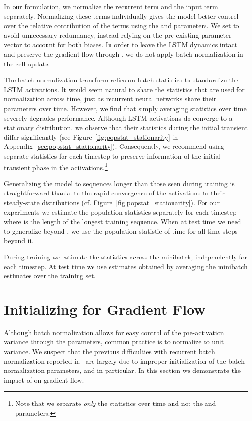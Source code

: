 \documentclass{article} \pdfoutput=1 \usepackage[utf8]{inputenc}
\begin{document}
In our formulation, we normalize the recurrent term 
and the input term  separately.  Normalizing these terms
individually gives the model better control over the relative contribution of
the terms using the  and  parameters.  We set  to avoid unnecessary redundancy, instead relying on the
pre-existing parameter vector  to account for both biases.  In order
to leave the LSTM dynamics intact and preserve the gradient flow through
, we do not apply batch normalization in the cell update.

The batch normalization transform relies on batch statistics to standardize the
LSTM activations.  It would seem natural to share the statistics that are used
for normalization across time, just as recurrent neural networks share their
parameters over time.  However, we find that simply averaging statistics over
time severely degrades performance.  Although LSTM activations do converge to a
stationary distribution, we observe that their statistics during the initial
transient differ significantly (see Figure~\ref{fig:popstat_stationarity} in Appendix~\ref{sec:popstat_stationarity}).
Consequently, we recommend using separate statistics for each timestep to
preserve information of the initial transient phase in the
activations.\footnote{ Note that we separate \emph{only} the statistics over
time and not the  and  parameters.}

Generalizing the model to sequences longer than those seen during training is
straightforward thanks to the rapid convergence of the activations to their
steady-state distributions (cf. Figure~\ref{fig:popstat_stationarity}).  For
our experiments we estimate the population statistics separately for each
timestep  where  is the length of the longest
training sequence.  When at test time we need to generalize beyond ,
we use the population statistic of time  for all time steps beyond it.

During training we estimate the statistics across the minibatch, independently
for each timestep.  At test time we use estimates obtained by averaging the
minibatch estimates over the training set.


\section{Initializing  for Gradient Flow}
\label{sec:activation-variance}

Although batch normalization allows for easy control of the pre-activation
variance through the  parameters, common practice is to normalize to
unit variance.  We suspect that the previous difficulties with recurrent batch
normalization reported in~\citet{cesar,baidu} are largely due to improper
initialization of the batch normalization parameters, and  in
particular.  In this section we demonstrate the impact of  on gradient
flow.
\end{document}
